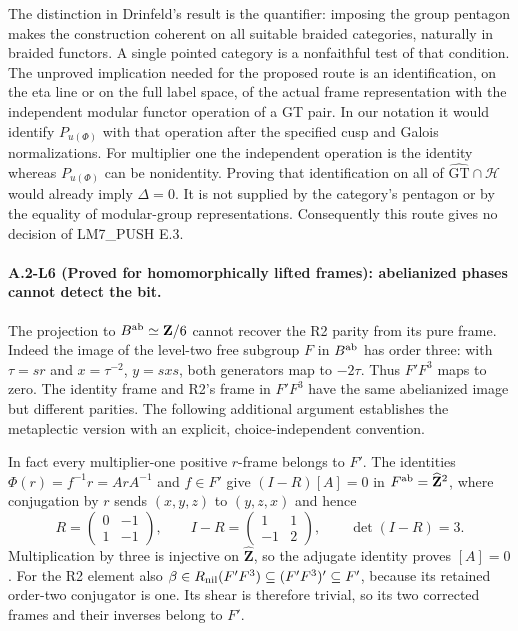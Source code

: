 The distinction in Drinfeld's result is the quantifier: imposing
the group pentagon makes the construction coherent on all suitable
braided categories, naturally in braided functors.  A single
pointed category is a nonfaithful test of that condition.  The
unproved implication needed for the proposed route is an
identification, on the eta line or on the full label space, of
the actual frame representation with the independent modular
functor operation of a GT pair.  In our notation it would identify
$P_{u(\Phi)}$ with that operation after the specified cusp and
Galois normalizations.  For multiplier one the independent operation
is the identity whereas $P_{u(\Phi)}$ can be nonidentity.  Proving
that identification on all of $\widehat{\mathrm{GT}}\cap\mathcal H$
would already imply $\Delta=0$.  It is not supplied by the
category's pentagon or by the equality of modular-group
representations.  Consequently this route gives no decision of
LM7\_PUSH E.3.

\paragraph{A.2-L6 (Proved for homomorphically lifted frames): abelianized phases cannot detect the bit.}
The projection to $B^{\rm ab}\simeq\mathbf Z/6$ cannot recover the
R2 parity from its pure frame.  Indeed the image of the level-two
free subgroup $F$ in $B^{\rm ab}$ has order three: with
$\tau=sr$ and $x=\tau^{-2}$, $y=sxs$, both generators map to
$-2\tau$.  Thus $F'F^3$ maps to zero.  The identity frame and
R2's frame in $F'F^3$ have the same abelianized image but different
parities.  The following additional argument establishes the
metaplectic version with an explicit, choice-independent convention.

In fact every multiplier-one positive $r$-frame belongs to $F'$.
The identities $\Phi(r)=f^{-1}r=ArA^{-1}$ and $f\in F'$
give $(I-R)[A]=0$ in $F^{\rm ab}=\widehat{\mathbf Z}^2$, where
conjugation by $r$ sends $(x,y,z)$ to $(y,z,x)$ and hence
\[
 R=\begin{pmatrix}0&-1\\1&-1\end{pmatrix},\qquad
 I-R=\begin{pmatrix}1&1\\-1&2\end{pmatrix},\qquad\det(I-R)=3.
\]
Multiplication by three is injective on $\widehat{\mathbf Z}$,
so the adjugate identity proves $[A]=0$. For the R2 element also
$\beta\in R_{\rm nil}(F'F^3)\subseteq(F'F^3)'\subseteq F'$,
because its retained order-two conjugator is one. Its shear is
therefore trivial, so its two corrected frames and their inverses
belong to $F'$.

